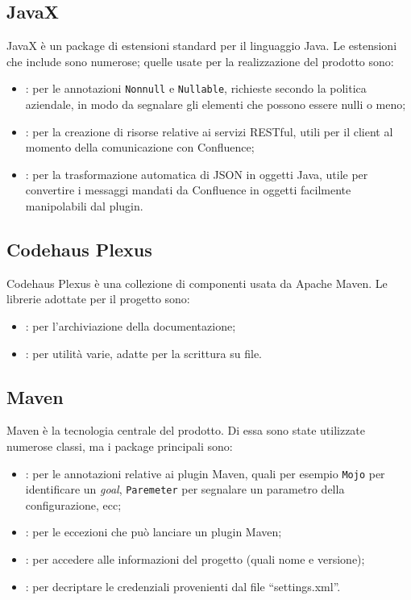 \subsection{JavaX}
JavaX è un package di estensioni standard per il linguaggio Java.
Le estensioni che include sono numerose; quelle usate per la realizzazione del prodotto sono:
\begin{itemize}
    \item {}: per le annotazioni  \texttt{Nonnull} e  \texttt{Nullable}, richieste secondo la politica aziendale, in modo da segnalare gli elementi che possono essere nulli o meno;
    \item {}: per la creazione di risorse relative ai servizi
    RESTful, utili per il client al momento della comunicazione con Confluence;
    \item {}: per la trasformazione automatica di JSON in oggetti Java, utile per convertire i messaggi mandati da Confluence in oggetti facilmente manipolabili dal plugin.
\end{itemize}


\subsection{Codehaus Plexus}
Codehaus Plexus è una collezione di componenti usata da Apache Maven.
Le librerie adottate per il progetto sono:
\begin{itemize}
    \item {}: per l'archiviazione della documentazione;
    \item {}: per utilità varie, adatte per la scrittura su file.
\end{itemize}


\subsection{Maven}
Maven è la tecnologia centrale del prodotto.
Di essa sono state utilizzate numerose classi, ma i package principali sono:
\begin{itemize}
    \item {}: per le annotazioni relative ai plugin Maven, quali per esempio \texttt{Mojo} per identificare un \emph{goal},  \texttt{Paremeter} per segnalare un parametro della configurazione, ecc;
    \item {}: per le eccezioni che può lanciare un plugin Maven;
    \item {}: per accedere alle informazioni del progetto (quali nome e versione);
    \item {}: per decriptare le credenziali provenienti dal file ``settings.xml''.
\end{itemize}


